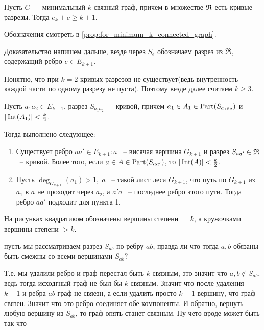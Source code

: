 \begin{customlm}{3.9} \label{lemma:3_9}
	Пусть $G$ ~-- минимальный  $k$-связный граф, причем в множестве  $\mathfrak{R}$ есть кривые разрезы.
	Тогда  $e_k + c \geqslant k + 1$.
\end{customlm}

Обозначения смотреть в \ref{prop:for_minimum_k_connected_graph}.

Доказательство напишем дальше, везде через $S_e$ обозначаем разрез из $\mathfrak{R}$, содержащий ребро $e \in E_{k + 1}$.

Понятно, что при  $k = 2$ кривых разрезов не существует(ведь внутренность каждой части по одному разрезу не пуста).
Поэтому везде далее считаем  $k \geqslant 3$.

\begin{customclaim}{1} \label{claim:3_1}
	Пусть $a_1a_2 \in E_{k + 1}$, разрез $S_{a_1 a_2}$ ~-- кривой, причем $a_1 \in A_1 \in \operatorname{Part}(S_{a_1a_2})$ и $|\operatorname{Int}(A_1)| < \frac{k}{2}$.

	Тогда выполнено следующее:

	\begin{enumerate}
		\item Существует ребро $aa' \in E_{k + 1} \colon a$ ~-- висячая вершина  $G_{k + 1}$ и разрез  $S_{aa'} \in \mathfrak{R}$ ~-- кривой. Более того, если $a \in A \in \operatorname{Part}(S_{aa'})$, то  $|\operatorname{Int}(A)| < \frac{k}{2}$.

		\item Пусть $\deg_{G_{k + 1}}(a_1) > 1, \; a$ ~-- такой лист леса $G_{k + 1}$, что путь по  $G_{k + 1}$ из $a_1$ в $a$ не проходит через $a_2$, а $a'a$  ~-- последнее ребро этого пути. Тогда ребро  $aa'$ подходит для пункта 1.
	\end{enumerate}

\end{customclaim}


На рисунках квадратиком обозначены вершины степени $= k$, а кружочками вершины степени  $> k$.


{\color{red} пусть мы рассматриваем разрез $S_{ab}$ по ребру $ab$, правда ли что тогда  $a, b$ обязаны быть смежны со всеми вершинами  $S_{ab}$?

Т.е. мы удалили ребро и граф перестал быть $k$ связным, это значит что  $a, b \not \in S_{ab}$, ведь тогда исходгный граф не был бы $k$-связным. Значит что после удаления $k - 1$ и ребра  $ab$ граф не свяезн, а если удалить просто  $k - 1$ вершину, что граф связен. Значит что это ребро соединяет обе компоненты. И обратно, вернуть любую вершину из $S_{ab}$, то граф опять станет связным. Ну чето вроде может быть так что}

